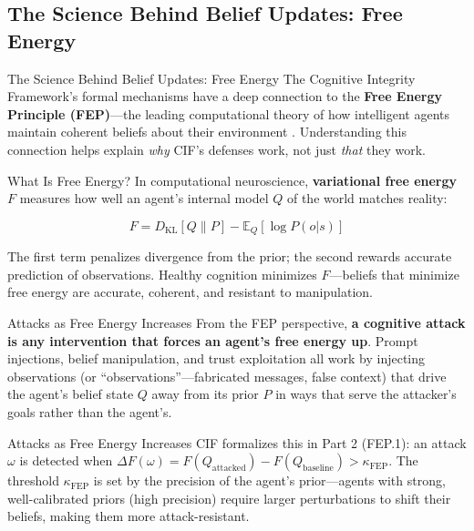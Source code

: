 \documentclass[
  ignorenonframetext,
]{beamer}
\begin{document}
\subsection{The Science Behind Belief Updates: Free
Energy}\label{sec:fep-connection}

\begin{frame}[allowframebreaks]{The Science Behind Belief Updates: Free
Energy}
The Cognitive Integrity Framework's formal mechanisms have a deep
connection to the \textbf{Free Energy Principle (FEP)}---the leading
computational theory of how intelligent agents maintain coherent beliefs
about their environment \cite{friston2010free}. Understanding this
connection helps explain \emph{why} CIF's defenses work, not just
\emph{that} they work.
\end{frame}

\begin{frame}[allowframebreaks]{What Is Free Energy?}
\protect{}\label{what-is-free-energy}
In computational neuroscience, \textbf{variational free energy} \(F\)
measures how well an agent's internal model \(Q\) of the world matches
reality:

\[F = D_\text{KL}[Q \| P] - \mathbb{E}_Q[\log P(o | s)]\]

The first term penalizes divergence from the prior; the second rewards
accurate prediction of observations. Healthy cognition minimizes
\(F\)---beliefs that minimize free energy are accurate, coherent, and
resistant to manipulation.
\end{frame}

\begin{frame}[allowframebreaks]{Attacks as Free Energy Increases}
\protect{}\label{attacks-as-free-energy-increases}
From the FEP perspective, \textbf{a cognitive attack is any intervention
that forces an agent's free energy up}. Prompt injections, belief
manipulation, and trust exploitation all work by injecting observations
(or ``observations''---fabricated messages, false context) that drive
the agent's belief state \(Q\) away from its prior \(P\) in ways that
serve the attacker's goals rather than the agent's.

\end{frame}

\begin{frame}[allowframebreaks]{Attacks as Free Energy Increases}
CIF formalizes this in Part 2 (FEP.1): an attack \(\omega\) is detected
when
\(\Delta F(\omega) = F(Q_\text{attacked}) - F(Q_\text{baseline}) > \kappa_\text{FEP}\).
The threshold \(\kappa_\text{FEP}\) is set by the precision of the
agent's prior---agents with strong, well-calibrated priors (high
precision) require larger perturbations to shift their beliefs, making
them more attack-resistant.
\end{frame}
\end{document}
